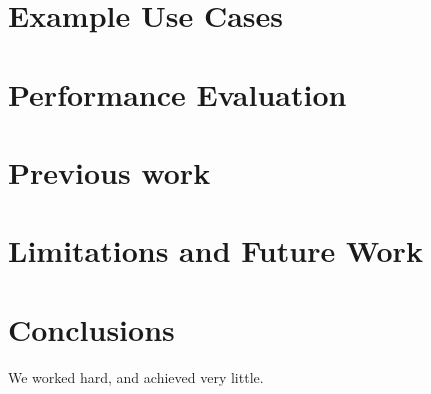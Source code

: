 \documentclass[10pt,twocolumn]{article}
\begin{document}
\section{Example Use Cases}\label{usecases}
\section{Performance Evaluation}\label{evaluation}
\section{Previous work}\label{previous:work}
\section{Limitations and Future Work}\label{future:work}
\section{Conclusions}\label{conclusions}
We worked hard, and achieved very little.



\end{document}
